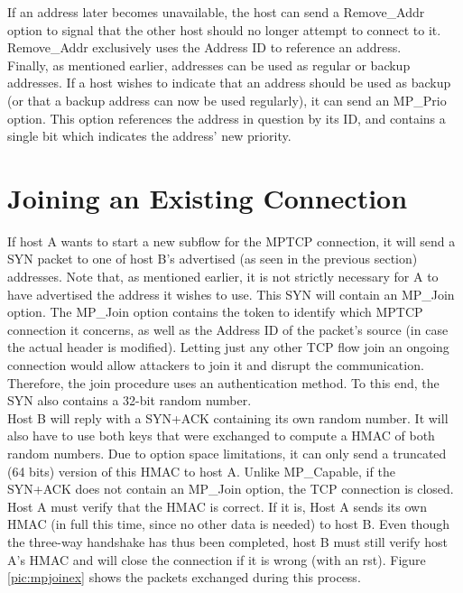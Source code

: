 If an address later becomes unavailable, the host can send a Remove\_Addr option to signal that the other host should no longer attempt to connect to it. Remove\_Addr exclusively uses the Address ID to reference an address. \\

Finally, as mentioned earlier, addresses can be used as regular or backup addresses. If a host wishes to indicate that an address should be used as backup (or that a backup address can now be used regularly), it can send an MP\_Prio option. This option references the address in question by its ID, and contains a single bit which indicates the address' new priority.

\section{Joining an Existing Connection}
If host A wants to start a new subflow for the MPTCP connection, it will send a SYN packet to one of host B's advertised (as seen in the previous section) addresses. Note that, as mentioned earlier, it is not strictly necessary for A to have advertised the address it wishes to use. This SYN will contain an MP\_Join option. The MP\_Join option contains the token to identify which MPTCP connection it concerns, as well as the Address ID of the packet's source (in case the actual header is modified). Letting just any other TCP flow join an ongoing connection would allow attackers to join it and disrupt the communication. Therefore, the join procedure uses an authentication method. To this end, the SYN also contains a 32-bit random number. \\

Host B will reply with a SYN+ACK containing its own random number. It will also have to use both keys that were exchanged to compute a HMAC of both random numbers. Due to option space limitations, it can only send a truncated (64 bits) version of this HMAC to host A. Unlike MP\_Capable, if the SYN+ACK does not contain an MP\_Join option, the TCP connection is closed. \\

Host A must verify that the HMAC is correct. If it is, Host A sends its own HMAC (in full this time, since no other data is needed) to host B. Even though the three-way handshake has thus been completed, host B must still verify host A's HMAC and will close the connection if it is wrong (with an rst). Figure  \ref{pic:mpjoinex} shows the packets exchanged during this process.

